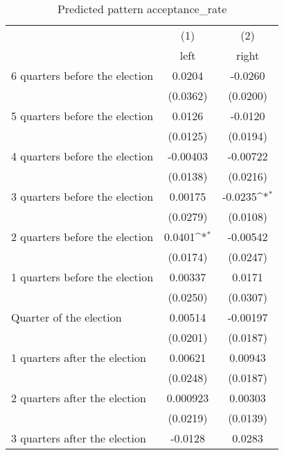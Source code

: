 \begin{table}[htbp]\centering
\def\sym#1{\ifmmode^{#1}\else\(^{#1}\)\fi}
\caption{Predicted pattern acceptance\_rate}
\begin{tabular}{l*{2}{c}}
\hline\hline
                    &\multicolumn{1}{c}{(1)}&\multicolumn{1}{c}{(2)}\\
                    &\multicolumn{1}{c}{left}&\multicolumn{1}{c}{right}\\
\hline
 6 quarters before the election&      0.0204         &     -0.0260         \\
                    &    (0.0362)         &    (0.0200)         \\
[1em]
 5 quarters before the election&      0.0126         &     -0.0120         \\
                    &    (0.0125)         &    (0.0194)         \\
[1em]
 4 quarters before the election&    -0.00403         &    -0.00722         \\
                    &    (0.0138)         &    (0.0216)         \\
[1em]
 3 quarters before the election&     0.00175         &     -0.0235\sym{*}  \\
                    &    (0.0279)         &    (0.0108)         \\
[1em]
 2 quarters before the election&      0.0401\sym{*}  &    -0.00542         \\
                    &    (0.0174)         &    (0.0247)         \\
[1em]
 1 quarters before the election&     0.00337         &      0.0171         \\
                    &    (0.0250)         &    (0.0307)         \\
[1em]
Quarter of the election&     0.00514         &    -0.00197         \\
                    &    (0.0201)         &    (0.0187)         \\
[1em]
 1 quarters after the election&     0.00621         &     0.00943         \\
                    &    (0.0248)         &    (0.0187)         \\
[1em]
 2 quarters after the election&    0.000923         &     0.00303         \\
                    &    (0.0219)         &    (0.0139)         \\
[1em]
 3 quarters after the election&     -0.0128         &      0.0283         \\

\end{tabular}
\end{table}
